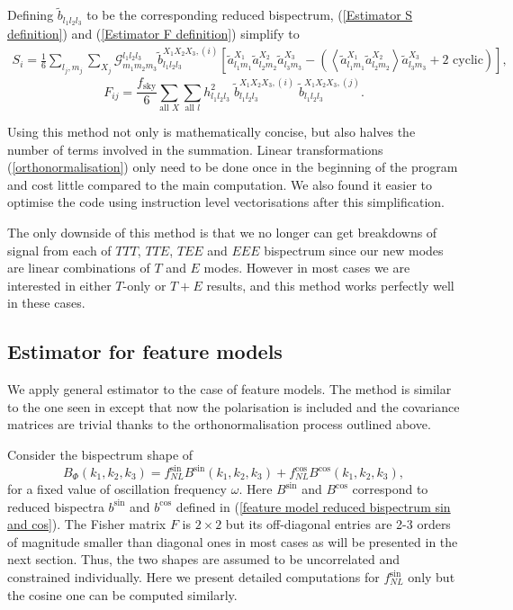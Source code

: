 Defining $\tilde{b}_{l_1 l_2 l_3}$ to be the corresponding reduced bispectrum, (\ref{Estimator S definition}) and (\ref{Estimator F definition}) simplify to
\begin{eqnarray}
	S_i =  \frac{1}{6} \sum_{l_j, m_j} \sum_{X_j} \mathcal{G}_{m_1 m_2 m_3}^{l_1 l_2 l_3} \tilde{b}_{l_1 l_2 l_3} ^{X_1 X_2 X_3, (i)} \left[ \tilde{a}_{l_1 m_1}^{X_1} \tilde{a}_{l_2 m_2}^{X_2} \tilde{a}_{l_3 m_3}^{X_3} -  \left( \left< \tilde{a}_{l_1 m_1}^{X_1} \tilde{a}_{l_2 m_2}^{X_2} \right> \tilde{a}_{l_3 m_3}^{X_3} + \text{2 cyclic} \right)   \right],
	\label{KSW estimator S after orthonormalisation}
\end{eqnarray}
\begin{equation}
	F_{ij}= \frac{f_\text{sky}}{6} \sum_{\text{all }X} \sum_{\text{all }l} h_{l_1 l_2 l_3}^2 \; \tilde{b}_{l_1 l_2 l_3}^{X_1 X_2 X_3, (i)} \; \tilde{b}_{l_1 l_2 l_3}^{X_1 X_2 X_3, (j)}.
	\label{KSW estimator F after orthonormalisation}
\end{equation}

Using this method not only is mathematically concise, but also halves the number of terms involved in the summation. Linear transformations (\ref{orthonormalisation}) only need to be done once in the beginning of the program and cost little compared to the main computation. We also found it easier to optimise the code using instruction level vectorisations after this simplification.

The only downside of this method is that we no longer can get breakdowns of signal from each of $TTT$, $TTE$, $TEE$ and $EEE$ bispectrum since our new modes are linear combinations of $T$ and $E$ modes. However in most cases we are interested in either $T$-only or $T+E$ results, and this method works perfectly well in these cases.

\subsection{Estimator for feature models}

We apply general estimator to the case of feature models. The method is similar to the one seen in \cite{Munchmeyer2014} except that now the polarisation is included and the covariance matrices are trivial thanks to the orthonormalisation process outlined above.

Consider the bispectrum shape of
\begin{equation}
	B_\Phi (k_1, k_2, k_3) = f_{NL}^{\sin} B^{\sin}(k_1, k_2, k_3) + f_{NL}^{\cos} B^{\cos}(k_1, k_2, k_3),
\end{equation}
for a fixed value of oscillation frequency $\omega$. Here $B^{\sin}$ and $B^{\cos}$ correspond to reduced bispectra $b^{\sin}$ and $b^{\cos}$ defined in (\ref{feature model reduced bispectrum sin and cos}). The Fisher matrix $F$ is $2\times2$ but its off-diagonal entries are 2-3 orders of magnitude smaller than diagonal ones in most cases as will be presented in the next section. Thus, the two shapes are assumed to be uncorrelated and constrained individually. Here we present detailed computations for $f_{NL}^{\sin}$ only but the cosine one can be computed similarly.

